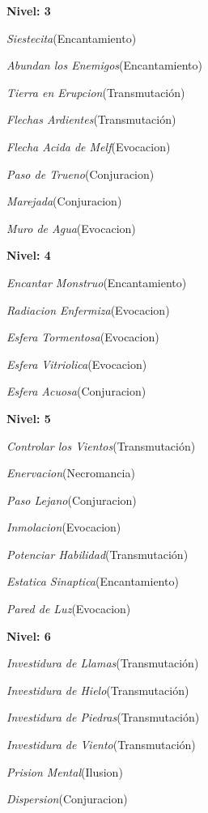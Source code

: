 \documentclass[a4paper,twocolumn,openany,10pt]{dndbook}
\begin{document}
\begin{list}{}{}
	\item \textbf{Nivel: 3}
	\begin{list}{}{}
		\item \textit{Siestecita}(Encantamiento)
		\item \textit{Abundan los Enemigos}(Encantamiento)
		\item \textit{Tierra en Erupcion}(Transmutación)
		\item \textit{Flechas Ardientes}(Transmutación)
		\item \textit{Flecha Acida de Melf}(Evocacion)
		\item \textit{Paso de Trueno}(Conjuracion)
		\item \textit{Marejada}(Conjuracion)
		\item \textit{Muro de Agua}(Evocacion)
	\end{list}

	\item \textbf{Nivel: 4}
	\begin{list}{}{}
		\item \textit{Encantar Monstruo}(Encantamiento)
		\item \textit{Radiacion Enfermiza}(Evocacion)
		\item \textit{Esfera Tormentosa}(Evocacion)
		\item \textit{Esfera Vitriolica}(Evocacion)
		\item \textit{Esfera Acuosa}(Conjuracion)
	\end{list}

	\item \textbf{Nivel: 5}
	\begin{list}{}{}
		\item \textit{Controlar los Vientos}(Transmutación)
		\item \textit{Enervacion}(Necromancia)
		\item \textit{Paso Lejano}(Conjuracion)
		\item \textit{Inmolacion}(Evocacion)
		\item \textit{Potenciar Habilidad}(Transmutación)
		\item \textit{Estatica Sinaptica}(Encantamiento)
		\item \textit{Pared de Luz}(Evocacion)
	\end{list}

	\item \textbf{Nivel: 6}
	\begin{list}{}{}
		\item \textit{Investidura de Llamas}(Transmutación)
		\item \textit{Investidura de Hielo}(Transmutación)
		\item \textit{Investidura de Piedras}(Transmutación)
		\item \textit{Investidura de Viento}(Transmutación)
		\item \textit{Prision Mental}(Ilusion)
		\item \textit{Dispersion}(Conjuracion)
	\end{list}


\end{list}
\end{document}
